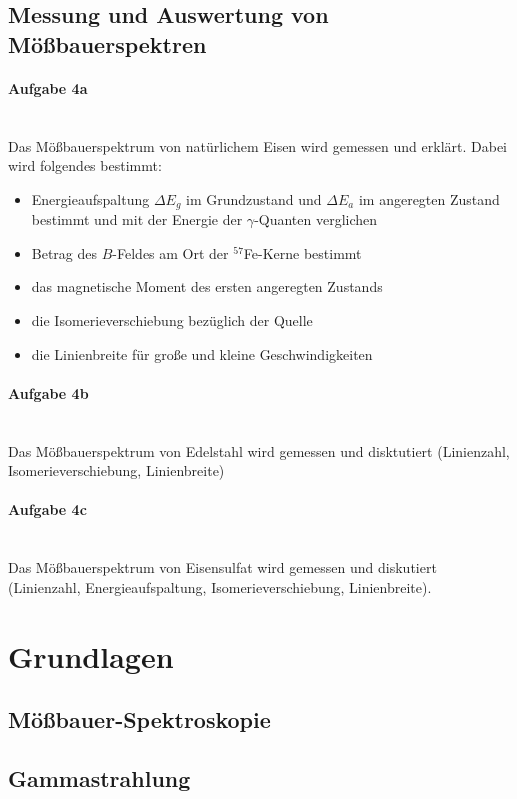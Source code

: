 \documentclass[a4paper,twoside,final]{article}
\begin{document}
\subsection{Messung und Auswertung von Mößbauerspektren}
\paragraph{Aufgabe 4a}$~$\\
Das Mößbauerspektrum von natürlichem Eisen wird gemessen und erklärt.
Dabei wird folgendes bestimmt:
\begin{itemize}
  \item Energieaufspaltung $\Delta E_g$ im Grundzustand und $\Delta E_a$ im angeregten Zustand bestimmt und mit der Energie der $\gamma$-Quanten verglichen
  \item Betrag des $B$-Feldes am Ort der $^{57}$Fe-Kerne bestimmt
  \item das magnetische Moment des ersten angeregten Zustands
  \item die Isomerieverschiebung bezüglich der Quelle
  \item die Linienbreite für große und kleine Geschwindigkeiten
\end{itemize}
\paragraph{Aufgabe 4b}$~$\\
Das Mößbauerspektrum von Edelstahl wird gemessen und disktutiert (Linienzahl, Isomerieverschiebung, Linienbreite)
\paragraph{Aufgabe 4c}$~$\\
Das Mößbauerspektrum von Eisensulfat wird gemessen und diskutiert (Linienzahl, Energieaufspaltung, Isomerieverschiebung, Linienbreite).
\newpage
\section{Grundlagen} \label{sec:Grundlagen}
\subsection{Mößbauer-Spektroskopie}

\subsection{Gammastrahlung}
\end{document}
